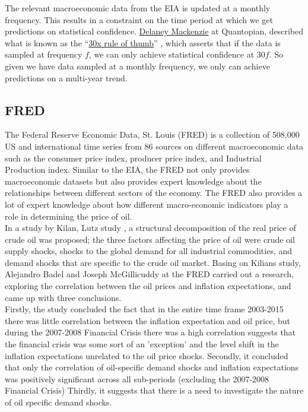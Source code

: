 The relevant macroeconomic data from the EIA is updated at a monthly frequency. This results in a constraint on the time period at which we get predictions on statistical confidence. \href{https://www.linkedin.com/in/delaney-granizo-mackenzie-23965080/}{Delaney Mackenzie} at Quantopian, described what is known as the \enquote{\href{https://twitter.com/thestreetquant/status/959449801321517056}{30x rule of thumb}} \label{30x}, which asserts that if the data is sampled at frequency $f$, we can only achieve statistical confidence at $30f$. So given we have data sampled at a monthly frequency, we only can achieve predictions on a multi-year trend. \\


\subsection{FRED}
\label{fred}

The Federal Reserve Economic Data, St. Louis (FRED) is a collection of  508,000 US and international time series from 86 sources \cite{fredweb} on different macroeconomic data such as the consumer price index, producer price index, and Industrial Production index. Similar to the EIA, the FRED not only provides macroeconomic datasets but also provides expert knowledge about the relationships between different sectors of the economy.  The FRED also provides a lot of expert knowledge about how different macro-economic indicators play a role in determining the price of oil.\\

In a study by Kilan, Lutz study \cite{lutzreport}, a structural decomposition of the real price of crude oil was proposed; the three factors affecting the price of oil were crude oil supply shocks, shocks to the global demand for all industrial commodities, and demand shocks that are specific to the crude oil market. Basing on Kilians study,  Alejandro Badel and Joseph McGillicuddy \cite{badelmcgillicuddy} at the FRED carried out a research, exploring the correlation between the oil prices and inflation expectations, and came up with three conclusions. \\

Firstly, the study concluded the fact that in the entire time frame 2003-2015 there was little correlation between the inflation expectation and oil price, but during the 2007-2008 Financial Crisis there was a high correlation suggests that the financial crisis was some sort of an 'exception' and the level shift in the inflation expectations unrelated to the oil price shocks. Secondly, it concluded that only the correlation of oil-specific demand shocks and inflation expectations was positively significant across all sub-periods (excluding the 2007-2008 Financial Crisis) Thirdly, it suggests that there is a need to investigate the nature of oil specific demand shocks. \\

